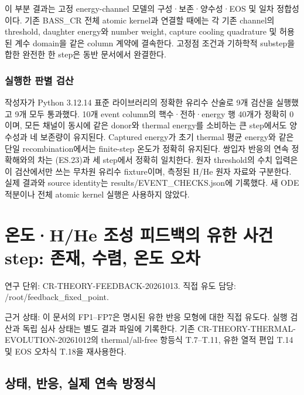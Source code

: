 \documentclass[11pt,a4paper]{article}
\begin{document}
이 부분 결과는 고정 energy-channel 모델의 구성·보존·양수성·EOS 및 일차 정합성이다. 기존 BASS\_CR 전체 atomic kernel과 연결할 때에는 각 기존 channel의 threshold, daughter energy와 number weight, capture cooling quadrature 및 허용된 계수 domain을 같은 column 계약에 결속한다. 고정점 조건과 기하학적 substep을 합한 완전한 한 step은 동반 문서에서 완결한다.

\hypertarget{uxc2e4uxd589uxd55c-uxd310uxbcc4-uxac80uxc0b0}{%
\subsubsection{실행한 판별 검산}\label{uxc2e4uxd589uxd55c-uxd310uxbcc4-uxac80uxc0b0}}

작성자가 Python 3.12.14 표준 라이브러리의 정확한 유리수 산술로 9개 검산을 실행했고 9개 모두 통과했다. 10개 event column의 핵수·전하·energy 행 40개가 정확히 0이며, 모든 채널이 동시에 같은 donor와 thermal energy를 소비하는 큰 step에서도 양수성과 네 보존량이 유지된다. Captured energy가 초기 thermal 평균 energy와 같은 단일 recombination에서는 finite-step 온도가 정확히 유지된다. 쌍입자 반응의 연속 정확해와의 차는 (ES.23)과 세 step에서 정확히 일치한다. 원자 threshold의 수치 입력은 이 검산에서만 쓰는 무차원 유리수 fixture이며, 측정된 H/He 원자 자료와 구분한다. 실제 결과와 source identity는 results/EVENT\_CHECKS.json에 기록했다. 새 ODE 적분이나 전체 atomic kernel 실행은 사용하지 않았다.

\hypertarget{uxc628uxb3c4hhe-uxc870uxc131-uxd53cuxb4dcuxbc31uxc758-uxc720uxd55c-uxc0acuxac74-step-uxc874uxc7ac-uxc218uxb834-uxc628uxb3c4-uxc624uxcc28}{%
\section{온도·H/He 조성 피드백의 유한 사건 step: 존재, 수렴, 온도 오차}\label{uxc628uxb3c4hhe-uxc870uxc131-uxd53cuxb4dcuxbc31uxc758-uxc720uxd55c-uxc0acuxac74-step-uxc874uxc7ac-uxc218uxb834-uxc628uxb3c4-uxc624uxcc28}}

연구 단위: CR-THEORY-FEEDBACK-20261013. 직접 유도 담당: /root/feedback\_fixed\_point.

근거 상태: 이 문서의 FP1--FP7은 명시된 유한 반응 모형에 대한 직접 유도다. 실행 검산과 독립 심사 상태는 별도 결과 파일에 기록한다. 기존 CR-THEORY-THERMAL-EVOLUTION-20261012의 thermal/all-free 항등식 T.7--T.11, 유한 열적 편입 T.14 및 EOS 오차식 T.18을 재사용한다.

\hypertarget{uxc0c1uxd0dc-uxbc18uxc751-uxc2e4uxc81c-uxc5f0uxc18d-uxbc29uxc815uxc2dd}{%
\subsection{상태, 반응, 실제 연속 방정식}\label{uxc0c1uxd0dc-uxbc18uxc751-uxc2e4uxc81c-uxc5f0uxc18d-uxbc29uxc815uxc2dd}}
\end{document}
